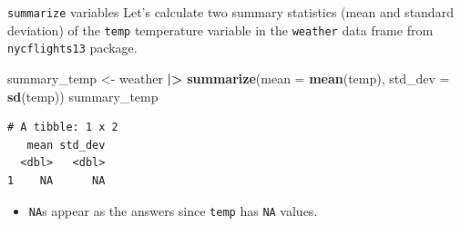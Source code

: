 \documentclass[
  ignorenonframetext,
]{beamer}
\newenvironment{Shaded}{\begin{snugshade}}{\end{snugshade}}
\newcommand{\AttributeTok}[1]{\textcolor[rgb]{0.13,0.29,0.53}{#1}}
\newcommand{\FunctionTok}[1]{\textcolor[rgb]{0.13,0.29,0.53}{\textbf{#1}}}
\newcommand{\NormalTok}[1]{#1}
\newcommand{\OtherTok}[1]{\textcolor[rgb]{0.56,0.35,0.01}{#1}}
\newcommand{\SpecialCharTok}[1]{\textcolor[rgb]{0.81,0.36,0.00}{\textbf{#1}}}
\providecommand{\tightlist}{%
  \setlength{\itemsep}{0pt}\setlength{\parskip}{0pt}}
\begin{document}
\begin{frame}[fragile]{\texttt{summarize} variables}
\protect\hypertarget{summarize-variables-1}{}
Let's calculate two summary statistics (mean and standard deviation) of
the \texttt{temp} temperature variable in the \texttt{weather} data
frame from \texttt{nycflights13} package.

\normalsize

\begin{Shaded}
\begin{Highlighting}[]
\NormalTok{summary\_temp }\OtherTok{\textless{}{-}}\NormalTok{ weather }\SpecialCharTok{|\textgreater{}} 
  \FunctionTok{summarize}\NormalTok{(}\AttributeTok{mean =} \FunctionTok{mean}\NormalTok{(temp), }\AttributeTok{std\_dev =} \FunctionTok{sd}\NormalTok{(temp))}
\NormalTok{summary\_temp}
\end{Highlighting}
\end{Shaded}

\begin{verbatim}
# A tibble: 1 x 2
   mean std_dev
  <dbl>   <dbl>
1    NA      NA
\end{verbatim}

\normalsize

\begin{itemize}
\tightlist
\item
  \texttt{NA}s appear as the answers since \texttt{temp} has \texttt{NA}
  values.
\end{itemize}
\end{frame}
\end{document}
